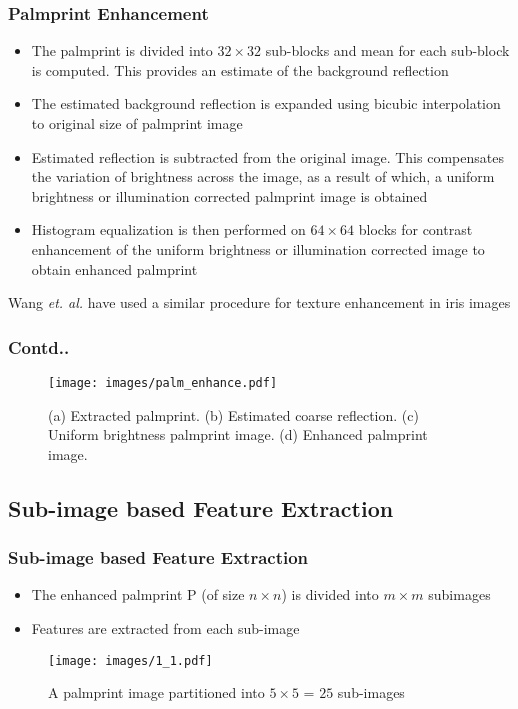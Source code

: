 \documentclass{beamer}
\begin{document}
\begin{frame}
 \frametitle{Palmprint Enhancement}
 \begin{itemize}
 	\item The palmprint is divided into $32 \times 32$ sub-blocks and mean for each sub-block is computed. This provides an estimate of the background reflection
 	\item The estimated background reflection is expanded using bicubic interpolation to original size of palmprint
image
	\item Estimated reflection is subtracted from the original image. This compensates the
variation of brightness across the image, as a result of which, a uniform brightness or illumination
corrected palmprint image is obtained
	\item Histogram equalization is then performed on $64 \times 64$ blocks for contrast enhancement of the uniform brightness or illumination corrected image to obtain enhanced palmprint
\end{itemize}
Wang \emph{et. al.} \cite{iris_enhance} have used a similar procedure for texture enhancement in iris images
\end{frame}

\begin{frame}
	\frametitle{Contd..}
	\begin{figure}[htp]
\begin{center}
\texttt{[image: images/palm\_enhance.pdf]}
\caption{(a) Extracted palmprint. (b) Estimated coarse reflection. (c) Uniform brightness palmprint image. (d) Enhanced palmprint image.
\label{palm_enhance} }
\end{center}
\end{figure}
\end{frame}


\subsection{Sub-image based Feature Extraction}

\begin{frame}
\frametitle{Sub-image based Feature Extraction}
	\begin{itemize}
		\item The enhanced palmprint P (of size $n \times n$) is divided into $m \times m$ subimages
		\item Features are extracted from each sub-image
	\end{itemize}
	\begin{figure}[htp]
\begin{center}
\texttt{[image: images/1\_1.pdf]}
\caption{A palmprint image partitioned into $5 \times 5$ = $25$ sub-images\label{sub_im} }
\end{center}
\end{figure}
\end{frame}
\end{document}
